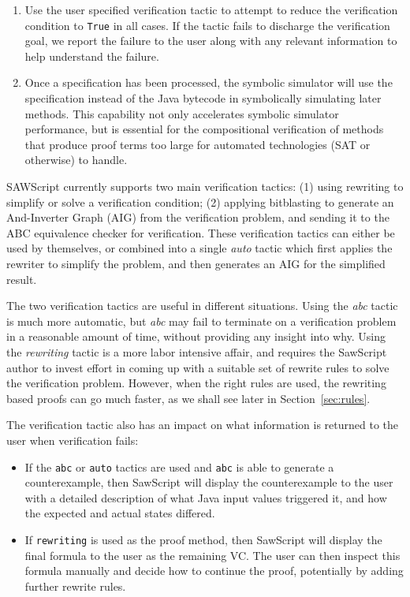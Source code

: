 \documentclass[12pt]{galois-whitepaper}
\newcommand{\sawScript}{{\sc SawScript}\xspace}
\begin{document}
\begin{enumerate}
 \item Use the user specified verification tactic to attempt to reduce the verification
         condition to {\tt True} in all cases.  If the tactic fails to discharge the
         verification goal, we report the failure to the user along with any
         relevant information to help understand the failure.
         
 \item Once a specification has been processed, the symbolic simulator will
         use the specification instead of the Java bytecode in symbolically
         simulating later methods.  This capability not only accelerates symbolic
         simulator performance, but is essential for the compositional
         verification of methods that produce proof terms too large for automated
         technologies (SAT or otherwise) to handle.
           
\end{enumerate}

SAWScript currently supports two main verification tactics: (1) using rewriting
to simplify or solve a verification condition; (2) applying bitblasting to
generate an And-Inverter Graph (AIG) from the verification problem, and sending
it to the ABC equivalence checker for verification.  These verification
tactics can either be used by themselves, or combined into a single \emph{auto}
tactic which first applies the rewriter to simplify the problem, and then
generates an AIG for the simplified result.

The two verification tactics are useful in different situations.  Using the
\emph{abc} tactic is much more automatic, but \emph{abc} may fail to terminate
on a verification problem in a reasonable amount of time, 
without providing any insight into why.  Using the
\emph{rewriting} tactic is a more labor intensive affair, and requires the
\sawScript author to invest effort in coming up with a suitable set of rewrite rules
to solve the verification problem. However, when the right rules are used, the
rewriting based proofs can go much faster, as we shall see later in Section~\ref{sec:rules}.

The verification tactic also has an impact on what information is returned
to the user when verification fails:
\begin{itemize}

  \item If the {\tt abc} or {\tt auto} tactics are used and {\tt abc} is able
          to generate a counterexample, then \sawScript will display the
          counterexample to the user with a detailed description of what Java
          input values triggered it, and how the expected and
          actual states differed.

  \item If {\tt rewriting} is used as the proof method, then \sawScript will
         display the final formula to the user as the remaining VC. The user
         can then inspect this formula manually and decide how to continue
         the proof, potentially by adding further rewrite rules.

\end{itemize}
\end{document}
